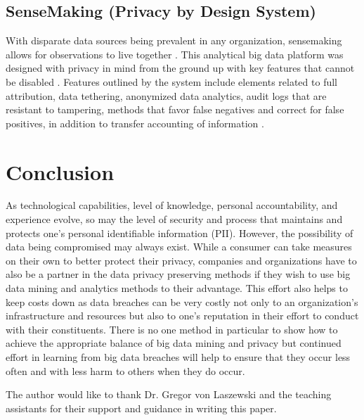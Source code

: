 \documentclass[sigconf]{acmart}
\begin{document}
\subsection{SenseMaking (Privacy by Design System)} 

With disparate data sources being prevalent in any organization, sensemaking allows for observations to live together \cite{Cavoukian2012}. This analytical big data platform was designed with privacy in mind from the ground up with key features that cannot be disabled \cite{Cavoukian2012}. Features outlined by the system include elements related to full attribution, data tethering, anonymized data analytics, audit logs that are resistant to tampering, methods that favor false negatives and correct for false positives, in addition to transfer accounting of information \cite{Cavoukian2012}. 


\section{Conclusion}
As technological capabilities, level of knowledge, personal accountability, and experience evolve, so may the level of security and process that maintains and protects one's personal identifiable information (PII). However, the possibility of data being compromised may always exist. While a consumer can take measures on their own to better protect their privacy, companies and organizations have to also be a partner in the data privacy preserving methods if they wish to use big data mining and analytics methods to their advantage. This effort also helps to keep costs down as data breaches can be very costly not only to an organization's infrastructure and resources but also to one's reputation in their effort to conduct  with their constituents. There is no one method in particular to show how to achieve the appropriate balance of big data mining and privacy but continued effort in learning from big data breaches will help to ensure that they occur less often and with less harm to others when they do occur. 


\begin{acks}

  The author would like to thank Dr. Gregor von Laszewski and the teaching assistants for their support and guidance in writing this paper.

\end{acks}


 
\end{document}
